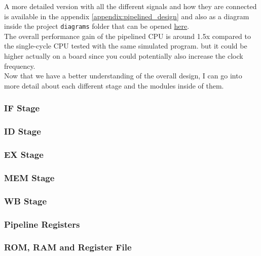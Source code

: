 A more detailed version with all the different signals and how they are connected is available in the appendix \ref{appendix:pipelined_design} and
also as a diagram inside the project \texttt{diagrams} folder that can be opened \href{https://app.diagrams.net/}{here}. \\
The overall performance gain of the pipelined CPU is around 1.5x compared to the single-cycle CPU tested with the same simulated program.
but it could be higher actually on a board since you could potentially also increase the clock frequency. \\

Now that we have a better understanding of the overall design, I can go into more detail about each different stage and the modules inside of them.

\subsubsection{IF Stage}



\subsubsection{ID Stage}





\subsubsection{EX Stage}



\subsubsection{MEM Stage}


\subsubsection{WB Stage}


\subsubsection{Pipeline Registers}


\subsubsection{ROM, RAM and Register File}











